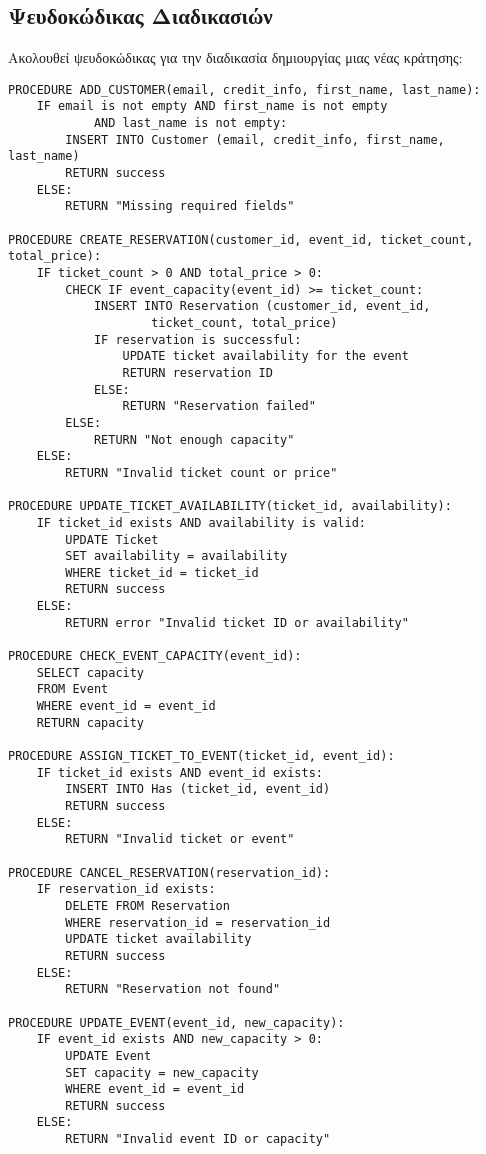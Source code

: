 \documentclass{article}
\begin{document}
\subsection*{Ψευδοκώδικας Διαδικασιών}
Ακολουθεί ψευδοκώδικας για την διαδικασία δημιουργίας μιας νέας κράτησης:
\begin{lstlisting}
PROCEDURE ADD_CUSTOMER(email, credit_info, first_name, last_name):
    IF email is not empty AND first_name is not empty 
    		AND last_name is not empty:
        INSERT INTO Customer (email, credit_info, first_name, last_name)
        RETURN success
    ELSE:
        RETURN "Missing required fields"

PROCEDURE CREATE_RESERVATION(customer_id, event_id, ticket_count, total_price):
    IF ticket_count > 0 AND total_price > 0:
        CHECK IF event_capacity(event_id) >= ticket_count:
            INSERT INTO Reservation (customer_id, event_id, 
            		ticket_count, total_price)
            IF reservation is successful:
                UPDATE ticket availability for the event
                RETURN reservation ID
            ELSE:
                RETURN "Reservation failed"
        ELSE:
            RETURN "Not enough capacity"
    ELSE:
        RETURN "Invalid ticket count or price"

PROCEDURE UPDATE_TICKET_AVAILABILITY(ticket_id, availability):
    IF ticket_id exists AND availability is valid:
        UPDATE Ticket 
        SET availability = availability 
        WHERE ticket_id = ticket_id
        RETURN success
    ELSE:
        RETURN error "Invalid ticket ID or availability"

PROCEDURE CHECK_EVENT_CAPACITY(event_id):
    SELECT capacity 
    FROM Event 
    WHERE event_id = event_id
    RETURN capacity
    
PROCEDURE ASSIGN_TICKET_TO_EVENT(ticket_id, event_id):
    IF ticket_id exists AND event_id exists:
        INSERT INTO Has (ticket_id, event_id)
        RETURN success
    ELSE:
        RETURN "Invalid ticket or event"

PROCEDURE CANCEL_RESERVATION(reservation_id):
    IF reservation_id exists:
        DELETE FROM Reservation 
        WHERE reservation_id = reservation_id
        UPDATE ticket availability
        RETURN success
    ELSE:
        RETURN "Reservation not found"

PROCEDURE UPDATE_EVENT(event_id, new_capacity):
    IF event_id exists AND new_capacity > 0:
        UPDATE Event 
        SET capacity = new_capacity 
        WHERE event_id = event_id
        RETURN success
    ELSE:
        RETURN "Invalid event ID or capacity"
        

\end{lstlisting}
\end{document}
